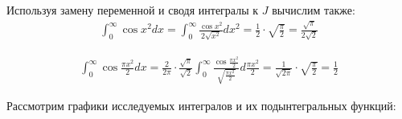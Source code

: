 \documentclass{article}
\begin{document}
Используя замену переменной и сводя интегралы к $J$ вычислим также:
\begin{equation*}
\begin{aligned}
\int_0^{\infty} \cos{x}^2 dx = \int_0^{\infty} \frac{\cos{x}^2}{2 \sqrt{x^2}} d x^2 = \frac{1}{2}\cdot \sqrt{\frac{\pi}{2}} = \frac{\sqrt{\pi}}{2\sqrt{2}}
\end{aligned}
\end{equation*}

\begin{equation*}
\begin{aligned}
\int_0^{\infty} \cos{\frac{\pi x^2}{2}} dx = \frac{2}{2\pi}\cdot \frac{\sqrt{\pi}}{\sqrt{2}}	\int_0^{\infty} \frac{\cos{\frac{\pi x^2}{2}}}{\sqrt{\frac{\pi x^2}{2}}} d \frac{\pi x^2}{2} = \frac{1}{\sqrt{2\pi}}\cdot \sqrt{\frac{\pi}{2}} = \frac{1}{2}
\end{aligned}
\end{equation*}

Рассмотрим графики исследуемых интегралов и их подынтегральных функций:
\end{document}
